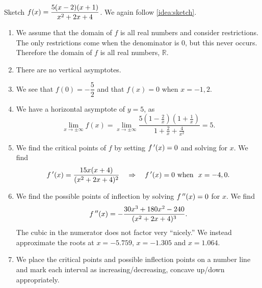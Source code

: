 \begin{example}\label{ex_sketch3}%
Sketch $\displaystyle f(x) = \frac{5(x-2)(x+1)}{x^2+2x+4}$.
\solution
We again follow \autoref{idea:sketch}.
	\begin{enumerate}
	\item	We assume that the domain of $f$ is all real numbers and consider restrictions. The only restrictions come when the denominator is 0, but this never occurs. Therefore the domain of $f$ is all real numbers, $\mathbb{R}$.
	\item	There are no vertical asymptotes.
	\item	We see that $f(0)=-\dfrac52$ and that $f(x)=0$ when $x=-1,2$.
	\item	We have a horizontal asymptote of $y=5$, as
	\[\lim_{x\to\pm\infty}f(x)=\lim_{x\to\pm\infty}\frac{5(1-\frac2x)(1+\frac1x)}{1+\frac2x+\frac4{x^2}}=5.\]
	\item	We find the critical points of $f$ by setting $f\,'(x)=0$ and solving for $x$. We find 
	\[
	f\,'(x) = \frac{15x(x+4)}{(x^2+2x+4)^2}
	\quad \Rightarrow \quad
	f\,'(x) = 0 \text{ when } \ x=-4,0.
	\]
	\item	We find the possible points of inflection by solving $f\,''(x) = 0$ for $x$. We find
	\[f\,''(x) = -\frac{30x^3+180x^2-240}{(x^2+2x+4)^3}.\]
	The cubic in the numerator does not factor very ``nicely.'' We instead approximate the roots at $x= -5.759$, $x=-1.305$ and $x=1.064$.
			
	\item	We place the critical points and possible inflection points on a number line and mark each interval as increasing/decreasing, concave up/down appropriately.

\begin{center}
\end{center}	


\end{enumerate}
\end{example}

